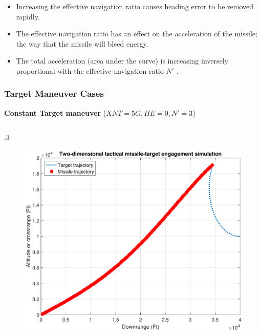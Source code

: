 \documentclass{beamer}
\begin{document}
\begin{frame}
	\begin{itemize}
		\item Increasing the effective navigation ratio causes heading error to be removed rapidly.
		\item The effective navigation ratio has an effect on the acceleration of the missile; the way that the missile will bleed energy.
		\item The total acceleration (area under the curve) is increasing inversely proportional with the effective navigation ratio $N'$ .
	\end{itemize}
\end{frame}
\begin{frame}
\frametitle{Target Maneuver Cases}
\textbf{ Constant Target maneuver} ($XNT=5G , HE=0 , N'=3$)

\begin{columns}[c]
	\begin{column} {.3\linewidth}
		\begin{figure}[htb]
			\centering
			\includegraphics[scale = 0.18]{fig/trajectoryXNT5HE0N3.pdf}
		\end{figure}
	\end{column}


\end{columns}
\end{frame}
\end{document}
